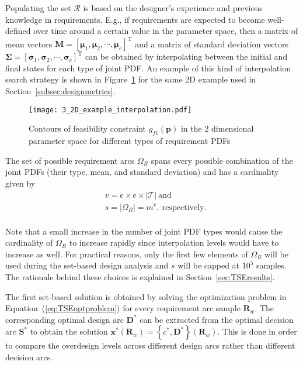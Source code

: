 Populating the set $\mathcal{R}$ is based on the designer's experience and previous knowledge in requirements. E.g., if requirements are expected to become well-defined over time around a certain value in the parameter space, then a matrix of mean vectors $\mathbf{M} = \left[\boldsymbol{\mu}_1,\boldsymbol{\mu}_2,\cdots,\boldsymbol{\mu}_e\right]^{\textrm{T}}$ and a matrix of standard deviation vectors $\boldsymbol{\Sigma} = \left[\boldsymbol{\sigma}_1,\boldsymbol{\sigma}_2,\cdots,\boldsymbol{\sigma}_e\right]^{\textrm{T}}$ can be obtained by interpolating between the initial and final states for each type of joint \ac{PDF}. An example of this kind of interpolation search strategy is shown in Figure~\ref{fig:2Dexampleinterp} for the same 2D example used in Section~\ref{subsec:designmetrics}.

\begin{figure}[h!]
	\centering
	\texttt{[image: 3\_2D\_example\_interpolation.pdf]}
	\caption{Contours of feasibility constraint $g_{f1}(\mathbf{p})$ in the 2 dimensional parameter space for different types of requirement \acp{PDF}}
	\label{fig:2Dexampleinterp}
\end{figure}

The set of possible requirement arcs $\Omega_R$ spans every possible combination of the joint \acp{PDF} (their type, mean, and standard deviation) and has a cardinality given by
%
\begin{equation*}
	\begin{aligned}
		& v = e \times e \times |\mathcal{T}|~\mathrm{and}\\
		& s = |\Omega_R| = m^{v},~\mathrm{respectively}.\\
	\end{aligned}
\end{equation*}

Note that a small increase in the number of joint \ac{PDF} types would cause the cardinality of $\Omega_R$ to increase rapidly since interpolation levels would have to increase as well. For practical reasons, only the first few elements of $\Omega_R$ will be used during the set-based design analysis and $s$ will be capped at $10^5$ samples. The rationale behind these choices is explained in Section~\ref{sec:TSEresults}.

The first set-based solution is obtained by solving the optimization problem in Equation~(\ref{eq:TSEoptproblem}) for every requirement arc sample $\mathbf{R}_w$. The corresponding optimal design arc $\mathbf{D}^*$ can be extracted from the optimal decision arc $\mathbf{S}^*$ to obtain the solution $\mathbf{x}^*(\mathbf{R}_w) = \left\{c^*,\mathbf{D}^*\right\}(\mathbf{R}_w)$. This is done in order to compare the overdesign levels across different design arcs rather than different decision arcs.

